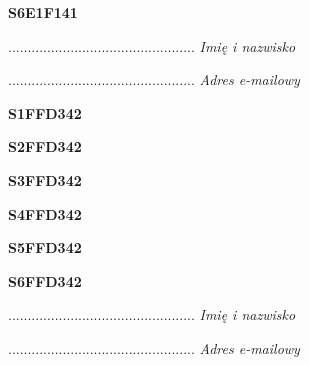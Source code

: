 \begin{turn}{90}\huge \textbf{S6E1F141}\end{turn}

\begin{turn}{90}\begin{minipage}{\linewidth} \vspace{20mm} ................................................  \textit{Imię i nazwisko}\end{minipage}\end{turn}

\begin{turn}{90}\begin{minipage}{\linewidth} \vspace{20mm} ................................................  \textit{Adres e-mailowy}\end{minipage}\end{turn}

\begin{turn}{90}\huge \textbf{S1FFD342}\end{turn}

\begin{turn}{90}\huge \textbf{S2FFD342}\end{turn}

\begin{turn}{90}\huge \textbf{S3FFD342}\end{turn}

\begin{turn}{90}\huge \textbf{S4FFD342}\end{turn}

\begin{turn}{90}\huge \textbf{S5FFD342}\end{turn}

\begin{turn}{90}\huge \textbf{S6FFD342}\end{turn}

\begin{turn}{90}\begin{minipage}{\linewidth} \vspace{20mm} ................................................  \textit{Imię i nazwisko}\end{minipage}\end{turn}

\begin{turn}{90}\begin{minipage}{\linewidth} \vspace{20mm} ................................................  \textit{Adres e-mailowy}\end{minipage}\end{turn}

